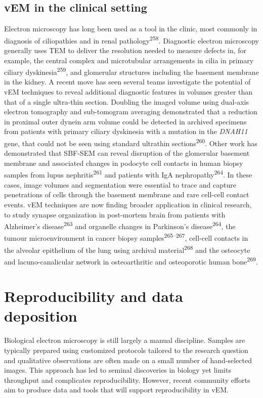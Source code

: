 \documentclass{article}
\begin{document}
\subsection*{vEM in the clinical setting}

Electron microscopy has long been used as a tool in the clinic, most commonly in diagnosis of ciliopathies and in renal pathology\textsuperscript{258}. Diagnostic electron microscopy generally uses TEM to deliver the resolution needed to measure defects in, for example, the central complex and microtubular arrangements in cilia in primary ciliary dyskinesia\textsuperscript{259}, and glomerular structures including the basement membrane in the kidney. A recent move has seen several teams investigate the potential of vEM techniques to reveal additional diagnostic features in volumes greater than that of a single ultra-thin section. Doubling the imaged volume using dual-axis electron tomography and sub-tomogram averaging demonstrated that a reduction in proximal outer dynein arm volume could be detected in archived specimens from patients with primary ciliary dyskinesia with a mutation in the \emph{DNAH11} gene, that could not be seen using standard ultrathin sections\textsuperscript{260}. Other work has demonstrated that SBF-SEM can reveal disruption of the glomerular basement membrane and associated changes in podocyte cell contacts in human biopsy samples from lupus nephritis\textsuperscript{261} and patients with IgA nephropathy\textsuperscript{264}. In these cases, image volumes and segmentation were essential to trace and capture penetrations of cells through the basement membrane and rare cell-cell contact events. vEM techniques are now finding broader application in clinical research, to study synapse organization in post-mortem brain from patients with Alzheimer’s disease\textsuperscript{263} and organelle changes in Parkinson’s disease\textsuperscript{264}, the tumour microenvironment in cancer biopsy samples\textsuperscript{265–267}, cell-cell contacts in the alveolar epithelium of the lung using archival material\textsuperscript{268} and the osteocyte and lacuno-canalicular network in osteoarthritic and osteoporotic human bone\textsuperscript{269}.


\section*{Reproducibility and data deposition}

Biological electron microscopy is still largely a manual discipline. Samples are typically prepared using customized protocols tailored to the research question and qualitative observations are often made on a small number of hand-selected images. This approach has led to seminal discoveries in biology yet limits throughput and complicates reproducibility. However, recent community efforts aim to produce data and tools that will support reproducibility in vEM.
\end{document}
